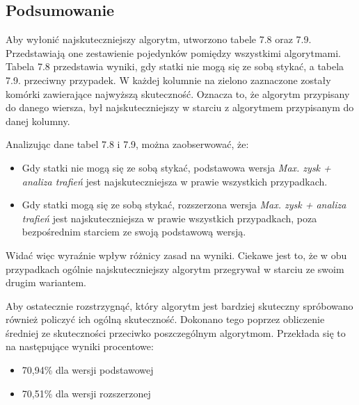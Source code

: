 \subsection{Podsumowanie}

Aby wyłonić najskuteczniejszy algorytm, utworzono tabele 7.8 oraz 7.9. Przedstawiają one zestawienie pojedynków pomiędzy wszystkimi algorytmami. Tabela 7.8 przedstawia wyniki, gdy statki nie mogą się ze sobą stykać, a tabela 7.9. przeciwny przypadek. W każdej kolumnie na zielono zaznaczone zostały komórki zawierające najwyższą skuteczność. Oznacza to, że algorytm przypisany do danego wiersza, był najskuteczniejszy w starciu z algorytmem przypisanym do danej kolumny.

Analizując dane tabel 7.8 i 7.9, można zaobserwować, że:

\begin{itemize}
    \item Gdy statki nie mogą się ze sobą stykać, podstawowa wersja  \emph{Max. zysk + analiza trafień} jest najskuteczniejsza w prawie wszystkich przypadkach. 
    \item Gdy statki mogą się ze sobą stykać, rozszerzona wersja  \emph{Max. zysk + analiza trafień} jest najskuteczniejsza w prawie wszystkich przypadkach, poza bezpośrednim starciem ze swoją podstawową wersją.
\end{itemize}

Widać więc wyraźnie wpływ różnicy zasad na wyniki. Ciekawe jest to, że w obu przypadkach ogólnie najskuteczniejszy algorytm przegrywał w starciu ze swoim drugim wariantem.

Aby ostatecznie rozstrzygnąć, który algorytm jest bardziej skuteczny spróbowano również policzyć ich ogólną skuteczność. Dokonano tego poprzez obliczenie średniej ze skuteczności przeciwko poszczególnym algorytmom. Przekłada się to na następujące wyniki procentowe:

\begin{itemize}
    \item 70,94\% dla wersji podstawowej
    \item 70,51\% dla wersji rozszerzonej
\end{itemize}

